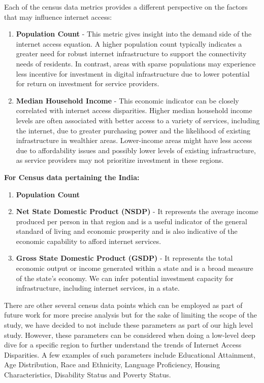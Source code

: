 \documentclass[conference]{IEEEtran}
\begin{document}
Each of the census data metrics provides a different perspective on the factors that may influence internet access:
\begin{enumerate}
    \item \textbf{Population Count} - This metric gives insight into the demand side of the internet access equation. A higher population count typically indicates a greater need for robust internet infrastructure to support the connectivity needs of residents. In contrast, areas with sparse populations may experience less incentive for investment in digital infrastructure due to lower potential for return on investment for service providers.
    \item \textbf{Median Household Income} - This economic indicator can be closely correlated with internet access disparities. Higher median household income levels are often associated with better access to a variety of services, including the internet, due to greater purchasing power and the likelihood of existing infrastructure in wealthier areas. Lower-income areas might have less access due to affordability issues and possibly lower levels of existing infrastructure, as service providers may not prioritize investment in these regions.
\end{enumerate}

\textbf{For Census data pertaining the India:}
\begin{enumerate}
    \item \textbf{Population Count}
    \item \textbf{Net State Domestic Product (NSDP)} - It represents the average income produced per person in that region and is a useful indicator of the general standard of living and economic prosperity and is also indicative of the economic capability to afford internet services.
    \item \textbf{Gross State Domestic Product (GSDP)} - It represents the total economic output or income generated within a state and is a broad measure of the state's economy. We can infer potential investment capacity for infrastructure, including internet services, in a state.
\end{enumerate}

There are other several census data points which can be employed as part of future work for more precise analysis but for the sake of limiting the scope of the study, we have decided to not include these parameters as part of our high level study. However, these parameters can be considered when doing a low-level deep dive for a specific region to further understand the trends of Internet Access Disparities. A few examples of such parameters include Educational Attainment, Age Distribution, Race and Ethnicity, Language Proficiency, Housing Characteristics, Disability Status and Poverty Status.
\end{document}
